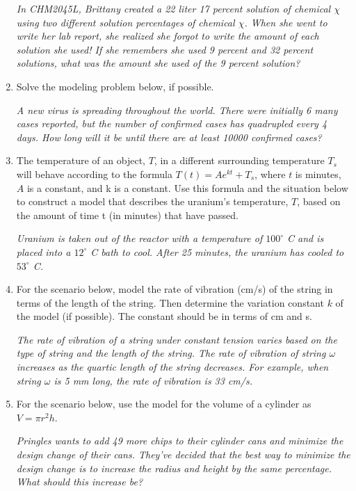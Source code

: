 \documentclass[14pt]{extbook}
\begin{document}
\begin{enumerate}
{\begin{center}
    \textit{ In CHM2045L, Brittany created a 22 liter 17 percent solution of chemical $\chi$ using two different solution percentages of chemical $\chi$. When she went to write her lab report, she realized she forgot to write the amount of each solution she used! If she remembers she used 9 percent and 32 percent solutions, what was the amount she used of the 9 percent solution? }
\end{center}
} \newpage
\item{
Solve the modeling problem below, if possible.
\begin{center}
    \textit{ A new virus is spreading throughout the world. There were initially 6 many cases reported, but the number of confirmed cases has quadrupled every 4 days. How long will it be until there are at least 10000 confirmed cases? }
\end{center}
} \newpage
\item{
The temperature of an object, $T$, in a different surrounding temperature $T_s$ will behave according to the formula $T(t) = Ae^{kt} + T_s$, where $t$ is minutes, $A$ is a constant, and k is a constant. Use this formula and the situation below to construct a model that describes the uranium's temperature, $T$, based on the amount of time t (in minutes) that have passed.
\begin{center}
    \textit{ Uranium is taken out of the reactor with a temperature of $100^{\circ}$ C and is placed into a $12^{\circ}$ C bath to cool. After 25 minutes, the uranium has cooled to $53^{\circ}$ C. }
\end{center}
} \newpage
\item{
For the scenario below, model the rate of vibration (cm/s) of the string in terms of the length of the string. Then determine the variation constant $k$ of the model (if possible). The constant should be in terms of cm and s.
\begin{center}
    \textit{ The rate of vibration of a string under constant tension varies based on the type of string and the length of the string. The rate of vibration of string $\omega$ increases as the quartic length of the string decreases. For example, when string $\omega$ is 5 mm long, the rate of vibration is 33 cm/s. }
\end{center}
} \newpage
\item{
For the scenario below, use the model for the volume of a cylinder as $V = \pi r^2 h$.
\begin{center}
    \textit{ Pringles wants to add 49  more chips to their cylinder cans and minimize the design change of their cans. They've decided that the best way to minimize the design change is to increase the radius and height by the same percentage. What should this increase be? }

\end{center}}
\end{enumerate}
\end{document}

